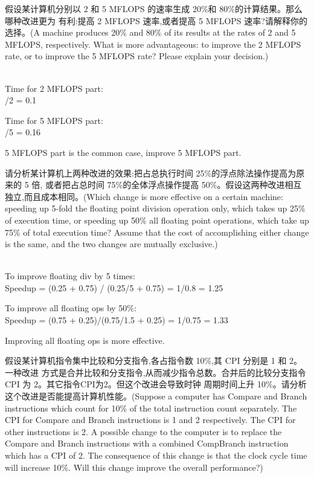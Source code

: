 \documentclass[a4paper, 12pt, addpoints, answers]{exam}
\begin{document}
\begin{questions}

\question[10]
假设某计算机分别以 2 和 5 MFLOPS 的速率生成 20\%和 80\%的计算结果。那么哪种改进更为
有利:提高 2 MFLOPS 速率,或者提高 5 MFLOPS 速率?请解释你的选择。(A machine produces 20\% and 80\%
of its results at the rates of 2 and 5 MFLOPS, respectively. What is more advantageous: to improve the 2 MFLOPS
rate, or to improve the 5 MFLOPS rate? Please explain your decision.)

\begin{solution}
{ } \\
Time for 2 MFLOPS part:  \\
/2 = 0.1   \\
\raggedright Time for 5 MFLOPS part: \\
/5 = 0.16   \\
\raggedright 5 MFLOPS part is the common case, improve 5 MFLOPS part. 
\end{solution}

\question[10]
请分析某计算机上两种改进的效果:把占总执行时间 25\%的浮点除法操作提高为原来的 5 倍,
或者把占总时间 75\%的全体浮点操作提高 50\%。假设这两种改进相互独立,而且成本相同。(Which change is
more effective on a certain machine: speeding up 5-fold the floating point division operation only, which takes up
25\% of execution time, or speeding up 50\% all floating point operations, which take up 75\% of total execution time?
Assume that the cost of accomplishing either change is the same, and the two changes are mutually exclusive.)

\begin{solution}
{ } \\
To improve floating div by 5 times:  \\
\centering Speedup = (0.25 + 0.75) / (0.25/5 + 0.75) = 1/0.8 = 1.25   \\
\raggedright To improve all floating ops by 50\%: \\
\centering Speedup = (0.75 + 0.25)/(0.75/1.5 + 0.25) = 1/0.75 = 1.33   \\
\raggedright Improving all floating ops is more effective. 
\end{solution}

\question[10]
假设某计算机指令集中比较和分支指令,各占指令数 10\%,其 CPI 分别是 1 和 2。一种改进
方式是合并比较和分支指令,从而减少指令总数。合并后的比较分支指令 CPI 为 2。其它指令CPI为2。但这个改进会导致时钟
周期时间上升 10\%。请分析这个改进是否能提高计算机性能。(Suppose a computer has Compare and Branch
instructions which count for 10\% of the total instruction count separately. The CPI for Compare and Branch
instructions is 1 and 2 respectively. The CPI for other instructions is 2. A possible change to the computer 
is to replace the Compare and Branch instructions with a combined CompBranch instruction which has a CPI of 
2. The consequence of this change is that the clock cycle time will increase 10\%. Will this change improve 
the overall performance?)


\end{questions}
\end{document}
